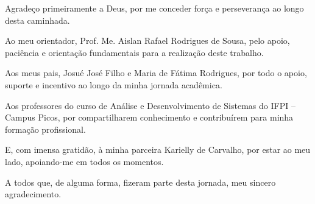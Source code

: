 \begin{agradecimentos}
  Agradeço primeiramente a Deus, por me conceder força e perseverança ao longo desta caminhada.
  
  Ao meu orientador, Prof. Me. Aislan Rafael Rodrigues de Sousa, pelo apoio, paciência e orientação fundamentais para a realização deste trabalho.
  
  Aos meus pais, Josué José Filho e Maria de Fátima Rodrigues, por todo o apoio, suporte e incentivo ao longo da minha jornada acadêmica.
  
  Aos professores do curso de Análise e Desenvolvimento de Sistemas do IFPI – Campus Picos, por compartilharem conhecimento e contribuírem para minha formação profissional.
  
  E, com imensa gratidão, à minha parceira Karielly de Carvalho, por estar ao meu lado, apoiando-me em todos os momentos.
  
  A todos que, de alguma forma, fizeram parte desta jornada, meu sincero agradecimento.
  \end{agradecimentos}